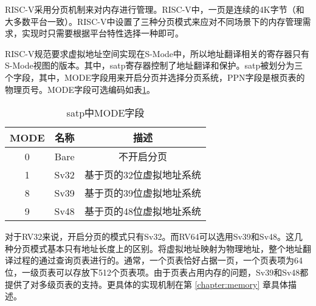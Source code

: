 RISC-V采用分页机制来对内存进行管理。RISC-V中，一页是连续的4K字节（和大多数平台一致）。RISC-V中设置了三种分页模式来应对不同场景下的内存管理需求，实现时只需要根据平台特性选择一种即可。

RISC-V规范要求虚拟地址空间实现在S-Mode中，所以地址翻译相关的寄存器只有S-Mode视图的版本。其中，satp寄存器控制了地址翻译和保护。satp被划分为三个字段，其中，MODE字段用来开启分页并选择分页系统，PPN字段是根页表的物理页号。MODE字段可选编码如表\ref{tab:satpmode}。

\begin{table}[h]
	\centering
	\setlength{\belowcaptionskip}{2pt}
	\caption{satp中MODE字段}
	\label{tab:satpmode}
	\begin{tabular}{ccc}
		\hline
		MODE             & 名称       & 描述                                        \\ \hline
		0                & Bare       & 不开启分页                                   \\ 
		1                & Sv32       & 基于页的32位虚拟地址系统                      \\ 
		8                & Sv39       & 基于页的39位虚拟地址系统                      \\ 
		9                & Sv48       & 基于页的48位虚拟地址系统                      \\ \hline
	\end{tabular}
\end{table}

对于RV32来说，开启分页的模式只有Sv32。而RV64可以选用Sv39和Sv48。这几种分页模式基本只有地址长度上的区别。将虚拟地址映射为物理地址，整个地址翻译过程的通过查询页表进行的。通常，一个页表恰好占据一页，一个页表项为64位，一级页表可以存放下512个页表项。由于页表占用内存的问题，Sv39和Sv48都提供了对多级页表的支持。更具体的实现机制在第 \ref{chapter:memory} 章具体描述。